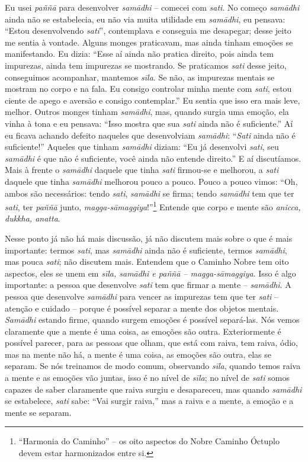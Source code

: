 Eu usei \emph{paññā} para desenvolver \emph{samādhi} –
comecei com \emph{sati}. No começo \emph{samādhi} ainda não se
estabelecia, eu não via muita utilidade em \emph{samādhi}, eu
pensava: “Estou desenvolvendo \emph{sati}”, contemplava e conseguia
me desapegar; desse jeito me sentia à vontade. Alguns monges
praticavam, mas ainda tinham emoções se manifestando. Eu dizia: “Esse
aí ainda não pratica direito, pois ainda tem impurezas, ainda tem
impurezas se mostrando. Se praticamos \emph{sati} desse jeito,
conseguimos acompanhar, mantemos \emph{sīla}. Se não, as impurezas
mentais se mostram no corpo e na fala. Eu consigo controlar minha mente
com \emph{sati}, estou ciente de apego e aversão e consigo
contemplar.” Eu sentia que isso era mais leve, melhor. Outros monges
tinham \emph{samādhi}, mas, quando surgia uma emoção, ela vinha à
tona e eu pensava: “Isso mostra que sua \emph{sati} ainda não é
suficiente.” Aí eu ficava achando defeito naqueles que desenvolviam
\emph{samādhi}: “\emph{Sati} ainda não é suficiente!” Aqueles que
tinham \emph{samādhi} diziam: “Eu já desenvolvi \emph{sati}, seu
\emph{samādhi} é que não é suficiente, você ainda não entende
direito.” E aí discutíamos. Mais à frente o \emph{samādhi} daquele
que tinha \emph{sati} firmou-se e melhorou, a \emph{sati} daquele
que tinha \emph{samādhi} melhorou pouco a pouco. Pouco a pouco
vimos: “Oh, ambos são necessários: tendo \emph{sati},
\emph{samādhi} se firma; tendo \emph{samādhi} tem que ter
\emph{sati}, ter \emph{paññā} junto,
\emph{magga-sāmaggiya}!”\footnote{“Harmonia do Caminho” -- os oito
aspectos do Nobre Caminho Óctuplo devem estar harmonizados entre si.}
Entende que corpo e mente são \emph{anicca, dukkha, anatta}. 

Nesse ponto já não há mais discussão, já não discutem mais sobre o
que é mais importante: termos \emph{sati}, mas \emph{samādhi}
ainda não é suficiente, termos \emph{samādhi}, mas pouca
\emph{sati}; não discutem mais. Entendem que o Caminho Nobre tem oito
aspectos, eles se unem em \emph{sīla, samādhi e paññā –
magga-sāmaggiya}. Isso é algo importante: a pessoa que desenvolve
\emph{sati} tem que firmar a mente – \emph{samādhi}. A pessoa que
desenvolve \emph{samādhi} para vencer as impurezas tem que ter
\emph{sati} – atenção e cuidado – porque é possível separar a mente
dos objetos mentais. \emph{Samādhi} estando firme, quando surgem
emoções é possível separá-las. Nós vemos claramente que a mente é uma
coisa, as emoções são outra. Exteriormente é possível parecer, para as
pessoas que olham, que está com raiva, tem raiva, ódio, mas na mente
não há, a mente é uma coisa, as emoções são outra, elas se separam. Se
nós treinamos de modo comum, observando \emph{sīla}, quando temos
raiva a mente e as emoções vão juntas, isso é no nível de
\emph{sīla}; no nível de \emph{sati} somos capazes de saber
claramente que raiva surgiu e desapareceu, mas quando
\emph{samādhi} se estabelece, \emph{sati} sabe: “Vai surgir
raiva,” mas a raiva e a mente, a emoção e a mente se separam. 

